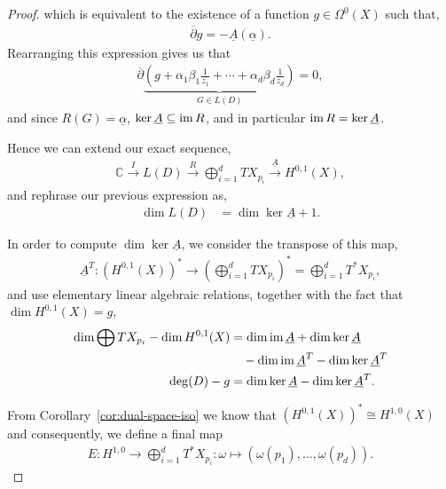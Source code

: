 \begin{theorem}
\begin{proof}
		which is equivalent to the existence of a function $ g \in \Omega^{0}(X) $
		such that,
		\begin{align*}
			\overline{\partial }g = - \underline{A}( \underline{\alpha} ).
		\end{align*}
		Rearranging this expression gives us that
		\begin{align*}
			\overline{\partial }\underbrace{\left( g+
				\alpha_{1}\beta_{1}\frac{1}{z_{1}}+ \cdots +
				\alpha_{d}\beta_{d}\frac{1}{z_{d}} \right)}_{G \in L(D)}=0,
		\end{align*}
		and since $ R(G)=\underline{\alpha} $, $ \ker \underline{A}\subseteq \operatorname{im} R
		$, and in particular $ \operatorname{im} R = \ker \underline{A} $.

		Hence we can extend our exact sequence,
		\begin{align*}
			\mathbb{C}\xrightarrow{\ I\ } L(D)\xrightarrow{\ R\ }
			\bigoplus_{i=1}^{d}{TX_{p_{i}}}\xrightarrow{\ \underline{A}\ } H^{0,1}(X),
		\end{align*}
		and rephrase our previous expression as,
		\begin{align*}
			\dim L(D) & = \dim\ker \underline{A} + 1.
		\end{align*}

		In order to compute $ \dim\ker \underline{A} $, we consider the transpose of
		this map,
		\begin{align*}
			\underline{A}^{T}: \left( H^{0,1}(X) \right)^{*}\to \left(
			\bigoplus_{i=1}^{d}{TX_{p_{i}}} \right)^{*} = \bigoplus_{i=1}^{d}{T
				^{*}X_{p_{i}}},
		\end{align*}
		and use elementary linear algebraic relations, together with the fact that $
			\dim H^{0,1}(X)=g $,
		\begin{align*}
			\dim\bigoplus{TX_{p_{i}}} - \dim H^{0,1}(X) & = \dim\operatorname{im} \underline{A} +
			\dim\ker \underline{A}
			\\ & \quad - \dim\operatorname{im}
			\underline{A}^{T} - \dim\ker
			\underline{A}^{T}
			\\ \deg(D)-g
			                                            & = \dim\ker \underline{A} -
			\dim\ker \underline{A}^{T}.
		\end{align*}

		From Corollary~\ref{cor:dual-space-iso} we know that $ ( H^{0,1}(X)
			)^{*}\cong H^{1,0}(X) $ and consequently, we define a final map
		\begin{align*}
			E:H^{1,0}\to \bigoplus_{i=1}^{d}{T ^{*}X_{p_{i}}}:\omega \mapsto (
			\omega ( p_{1} ),..., \omega ( p_{d} ) ).
		\end{align*}


\end{proof}
\end{theorem}
